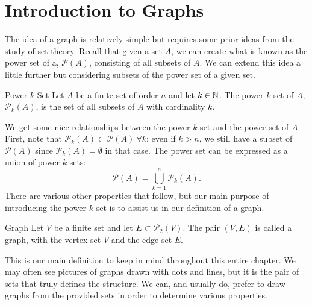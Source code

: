 \section{Introduction to Graphs}

The idea of a graph is relatively simple but requires some prior ideas from the study of set theory.
Recall that given a set $A$, we can create what is known as the power set of a, $\mathcal{P}(A)$, consisting of all subsets of $A$.
We can extend this idea a little further but considering subsets of the power set of a given set.

\begin{definition}{Power-$k$ Set}
    Let $A$ be a finite set of order $n$ and let $k\in\mathbb{N}$.
    The power-$k$ set of $A$, $\mathcal{P}_{k}(A)$, is the set of all subsets of $A$ with cardinality $k$.
\end{definition}

We get some nice relationships between the power-$k$ set and the power set of $A$.
First, note that $\mathcal{P}_{k}(A)\subset\mathcal{P}(A)\ \forall k$; even if $k > n$, we still have a subset of $\mathcal{P}(A)$ since $\mathcal{P}_{k}(A)=\emptyset$ in that case.
The power set can be expressed as a union of power-$k$ sets:
\[
    \mathcal{P}(A) = \bigcup_{k=1}^{n}\mathcal{P}_{k}(A).
\]
There are various other properties that follow, but our main purpose of introducing the power-$k$ set is to assist us in our definition of a graph.

\begin{definition}{Graph}
    Let $V$ be a finite set and let $E\subset\mathcal{P}_{2}(V)$.
    The pair $(V,E)$ is called a graph, with the vertex set $V$ and the edge set $E$.
\end{definition}

This is our main definition to keep in mind throughout this entire chapter.
We may often see pictures of graphs drawn with dots and lines, but it is the pair of sets that truly defines the structure.
We can, and usually do, prefer to draw graphs from the provided sets in order to determine various properties.

